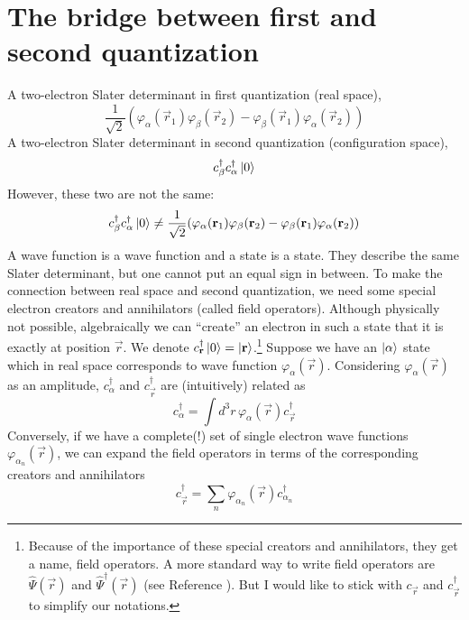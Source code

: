 \section{The bridge between first and second quantization}
A two-electron Slater determinant in first quantization (real space),
\begin{equation*}
\frac{1}{\sqrt{2}}(\varphi_\alpha(\vec{r}_1)\varphi_\beta(\vec{r}_2)
- \varphi_\beta(\vec{r}_1)\varphi_\alpha(\vec{r}_2))
\end{equation*}
%
A two-electron Slater determinant in second quantization (configuration space),
\begin{equation*}
c_\beta^\dagger c_\alpha^\dagger \Ket{0}
\end{equation*}
%
However, these two are not the same:
\begin{equation} \label{eq:real2nd}
c_\beta^\dagger c_\alpha^\dagger \Ket{0} \ne
\frac{1}{\sqrt{2}}(\varphi_\alpha(\vec{r}_1)\varphi_\beta(\vec{r}_2)
- \varphi_\beta(\vec{r}_1)\varphi_\alpha(\vec{r}_2))
\end{equation}
%
A wave function is a wave function and a state is a state.
They describe the same Slater determinant, but one cannot put an equal sign in between.
To make the connection between real space and second quantization, we need some
special electron creators and annihilators (called field operators).
Although physically not possible,
algebraically we can ``create'' an electron in such a state that it is
exactly at position $\vec{r}$. We denote
$c_\vec{r}^\dagger \Ket{0} = \Ket{\vec{r}}$.\footnote{Because of the importance of
these special creators and annihilators, they get a name, field operators. A more
standard way to write field operators are $\hat{\Psi}(\vec{r})$ and
$\hat{\Psi}^\dagger(\vec{r})$ (see Reference \cite{GBK}). But I would like to 
stick with $c_\vec{r}$ and $c_\vec{r}^\dagger$ to simplify our notations.}
Suppose we have an $\Ket{\alpha}$ state which in real space corresponds
to wave function $\varphi_\alpha(\vec{r})$.
Considering $\varphi_\alpha(\vec{r})$ as an amplitude, $c_\alpha^\dagger$
and $c_\vec{r}^\dagger$ are (intuitively) related as
\begin{equation} \label{eq:cacr}
c_\alpha^\dagger = \int d^3r\,\varphi_\alpha(\vec{r}) c_\vec{r}^\dagger
\end{equation}
%
Conversely, if we have a complete(!) set of single electron wave
functions $\varphi_{\alpha_n}(\vec{r})$, we can expand the field operators
in terms of the corresponding creators and annihilators
\begin{equation} \label{eq:crca}
c_\vec{r}^\dagger = \sum_n \varphi_{\alpha_n}(\vec{r}) c_{\alpha_n}^\dagger
\end{equation}
